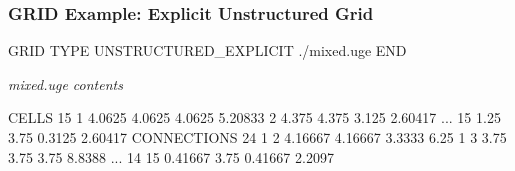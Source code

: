 \begin{frame}[fragile]\frametitle{GRID Example: Explicit Unstructured Grid}

\begin{semiverbatim}
GRID
  TYPE UNSTRUCTURED_EXPLICIT ./mixed.uge
END
\end{semiverbatim}
\textit{mixed.uge contents}
\begin{semiverbatim}
CELLS 15
1 4.0625 4.0625 4.0625 5.20833
2 4.375 4.375 3.125 2.60417
...
15 1.25 3.75 0.3125 2.60417
CONNECTIONS 24
1 2 4.16667 4.16667 3.3333 6.25
1 3 3.75 3.75 3.75 8.8388
...
14 15 0.41667 3.75 0.41667 2.2097
\end{semiverbatim}

\end{frame}
